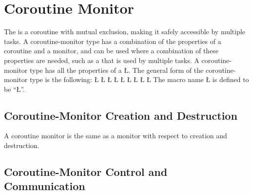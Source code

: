 \documentclass[openright,twoside]{report}
\begin{document}
\section{Coroutine Monitor}

The  is a coroutine with mutual exclusion, making it safely accessible by multiple tasks.
A coroutine-monitor type has a combination of the properties of a coroutine and a monitor, and can be used where a combination of these properties are needed, such as a  that is used by multiple tasks.
A coroutine-monitor type has all the properties of a \LGinlinetrue\LGbegin\lgrinde\L{}\endlgrinde\LGend{}.
The general form of the coroutine-monitor type is the following:
\LGinlinefalse\LGbegin\lgrinde
\L{}
\L{}
\L{\LB{}}
\CE{}\L{}
\L{\LB{}}
\CE{}\L{\LB{}}
\CE{}\L{}
\L{\LB{}}
\CE{}\L{\LB{\};}}
\endlgrinde\LGend
{}%
The macro name \LGinlinetrue\LGbegin\lgrinde\L{}\endlgrinde\LGend{} is defined to be ``\LGinlinetrue\LGbegin\lgrinde\L{}\endlgrinde\LGend{}''.


\subsection{Coroutine-Monitor Creation and Destruction}

A coroutine monitor is the same as a monitor with respect to creation and destruction.


\subsection{Coroutine-Monitor Control and Communication}
\end{document}
